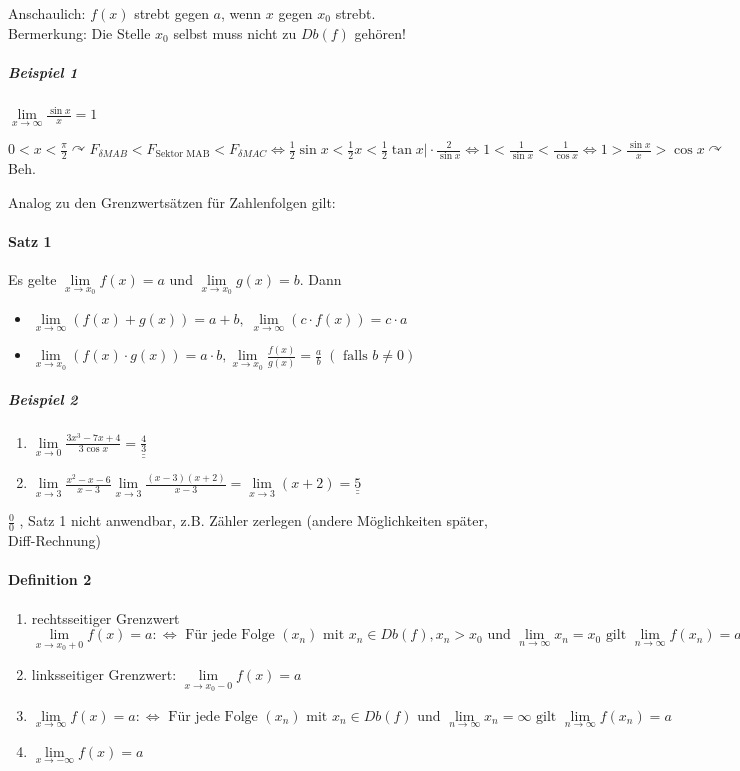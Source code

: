 \documentclass[a4paper]{scrartcl}
\begin{document}
Anschaulich: $f(x)$ strebt gegen $a$, wenn $x$ gegen $x_0$ strebt.\\
Bermerkung: Die Stelle $x_0$ selbst muss nicht zu $Db(f)$ gehören!

\subparagraph{Beispiel 1} $\lim\limits_{x \to \infty} \frac{\sin{x}}{x} = 1$

$0 < x < \frac{\pi}{2} \curvearrowright F_{\delta MAB} < F_{\text{Sektor MAB}} < F_{\delta MAC} \Leftrightarrow \frac{1}{2} \sin{x} < \frac{1}{2} x < \frac{1}{2} \tan{x} \vert \cdot \frac{2}{\sin{x}} \Leftrightarrow 1 < \frac{1}{\sin{x}} < \frac{1}{\cos{x}} \Leftrightarrow 1 > \frac{\sin{x}}{x} > \cos{x} \curvearrowright$ Beh.

Analog zu den Grenzwertsätzen für Zahlenfolgen gilt:

\paragraph{Satz 1} Es gelte $\lim\limits_{x \to x_0} f(x) = a \text{ und } \lim\limits_{x \to x_0} g(x) = b$. Dann 
\begin{itemize}
\item $\lim\limits_{x \to \infty} (f(x) + g(x) ) = a + b, \; \lim\limits_{x \to \infty} (c \cdot f(x)) = c \cdot a$
\item $\lim\limits_{x \to x_0} ( f(x) \cdot g(x) ) = a \cdot b, \lim\limits_{x \to x_0} \frac{f(x)}{g(x)} = \frac{a}{b} \;  (\text{ falls } b \neq 0)$
\end{itemize}

\subparagraph{Beispiel 2}
\begin{enumerate}
\item $\lim\limits_{x \to 0} \frac{3x^3 - 7x +4}{3 \cos{x}} = \underline{\underline{\frac{4}{3}}}$
\item $\lim\limits_{x \to 3} \frac{x^2 -x -6}{x-3} \lim\limits_{x \to 3} \frac{(x-3) (x+2)}{x-3} = \lim\limits_{x \to 3} (x+2) = \underline{\underline{5}}$
\end{enumerate}

$\frac{0}{0}$ , Satz 1 nicht anwendbar, z.B. Zähler zerlegen (andere Möglichkeiten später, Diff-Rechnung)

\paragraph{Definition 2}
\begin{enumerate}
\item rechtsseitiger Grenzwert\\
$\lim\limits_{x \to x_0 + 0} f(x) = a :\Leftrightarrow \text{ Für jede Folge } (x_n) \text{ mit } x_n \in Db(f), x_n > x_0 \text{ und } \lim\limits_{n \to \infty} x_n = x_0 \text{ gilt } \lim\limits_{n \to \infty} f(x_n) = a$
\item linksseitiger Grenzwert: $\lim\limits_{x \to x_0 - 0} f(x) = a$
\item $\lim\limits_{x \to \infty} f(x) = a : \Leftrightarrow \text{ Für jede Folge } (x_n) \text{ mit } x_n \in Db(f) \text{ und } \lim\limits_{n \to \infty} x_n = \infty \text{ gilt } \lim\limits_{n \to \infty} f(x_n) = a$
\item $\lim\limits_{x \to - \infty} f(x) = a$
\end{enumerate}
\end{document}

